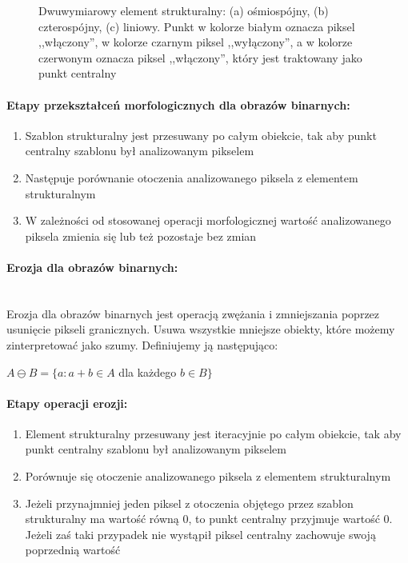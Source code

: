 \documentclass[a4paper,12pt,twoside,openany]{report}
\newcommand{\ImgPath}{.}
\begin{document}
\begin{figure}[H]
	\centering
	\caption{Dwuwymiarowy element strukturalny: (a) ośmiospójny, (b) czterospójny, (c) liniowy. Punkt w kolorze białym oznacza piksel ,,włączony'', w kolorze czarnym piksel ,,wyłączony'', a w kolorze czerwonym oznacza piksel ,,włączony'', który jest traktowany jako punkt centralny}
\end{figure}

\paragraph{Etapy przekształceń morfologicznych dla obrazów binarnych:}
\begin{enumerate}
	\item Szablon strukturalny jest przesuwany po całym obiekcie, tak aby punkt centralny szablonu był analizowanym pikselem
	\item Następuje porównanie otoczenia analizowanego piksela z elementem strukturalnym
	\item W zależności od stosowanej operacji morfologicznej wartość analizowanego piksela zmienia się lub też pozostaje bez zmian
\end{enumerate}

\paragraph{Erozja dla obrazów binarnych:}\mbox{} \\
\indent Erozja dla obrazów binarnych jest operacją zwężania i zmniejszania poprzez usunięcie pikseli granicznych. Usuwa wszystkie mniejsze obiekty, które możemy zinterpretować jako szumy. Definiujemy ją następująco:
\begin{center}
	$ A \ominus B = \{a \colon a + b \in A$ dla każdego $b \in B\} $ 
\end{center}

\paragraph{Etapy operacji erozji:}
\begin{enumerate}
	\item Element strukturalny przesuwany jest iteracyjnie po całym obiekcie,  tak aby punkt centralny szablonu był analizowanym pikselem
	\item Porównuje się otoczenie analizowanego piksela z elementem strukturalnym
	\item  Jeżeli przynajmniej jeden piksel z otoczenia objętego przez szablon strukturalny ma wartość równą 0, to punkt centralny przyjmuje wartość 0. Jeżeli zaś taki przypadek nie wystąpił piksel centralny zachowuje swoją poprzednią wartość
\end{enumerate}
\end{document}
